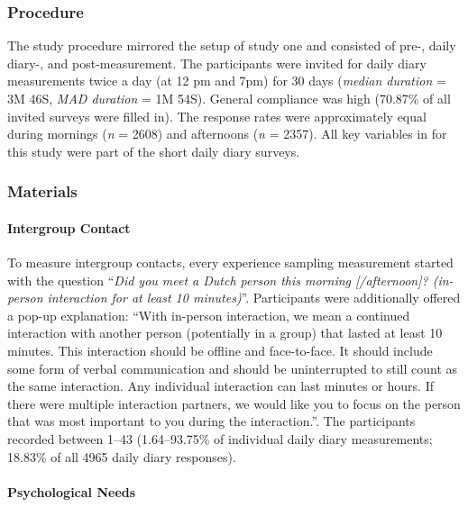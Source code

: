 \subsubsection{Procedure}

The study procedure mirrored the setup of study one and consisted of
pre-, daily diary-, and post-measurement. The participants were invited
for daily diary measurements twice a day (at 12 pm and 7pm) for 30 days
(\textit{median duration} = 3M 46S, \textit{MAD duration} = 1M 54S).
General compliance was high (70.87\% of all invited surveys were filled
in). The response rates were approximately equal during mornings
(\textit{n} = 2608) and afternoons (\textit{n} = 2357). All key
variables in for this study were part of the short daily diary surveys.

\subsubsection{Materials}

\paragraph{Intergroup Contact}

To measure intergroup contacts, every experience sampling measurement
started with the question
``\textit{Did you meet a Dutch person this morning [/afternoon]? (in-person interaction for at least 10 minutes)}''.
Participants were additionally offered a pop-up explanation: ``With
in-person interaction, we mean a continued interaction with another
person (potentially in a group) that lasted at least 10 minutes. This
interaction should be offline and face-to-face. It should include some
form of verbal communication and should be uninterrupted to still count
as the same interaction. Any individual interaction can last minutes or
hours. If there were multiple interaction partners, we would like you to
focus on the person that was most important to you during the
interaction.''. The participants recorded between 1--43 (1.64--93.75\%
of individual daily diary measurements; 18.83\% of all 4965 daily diary
responses).

\paragraph{Psychological Needs}

